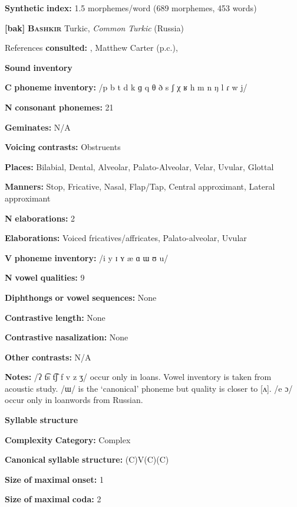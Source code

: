 \begin{styleBody}
\textbf{Synthetic} \textbf{index:} 1.5 morphemes/word (689 morphemes, 453 words)

\textbf{[bak]}   \textbf{\textsc{Bashkir}}  Turkic, \textit{Common} \textit{Turkic} (Russia)

References \textbf{consulted:} \citet{BerksonEtAl2016}, Matthew Carter (p.c.), \citet{Poppe1964}

\textbf{Sound} \textbf{inventory}

\textbf{C} \textbf{phoneme} \textbf{inventory:} /p b t d k ɡ q θ ð s ʃ χ ʁ h m n ŋ l ɾ w j/

\textbf{N} \textbf{consonant} \textbf{phonemes:} 21

\textbf{Geminates:} N/A

\textbf{Voicing} \textbf{contrasts:} Obstruents

\textbf{Places:} Bilabial, Dental, Alveolar, Palato-Alveolar, Velar, Uvular, Glottal

\textbf{Manners:} Stop, Fricative, Nasal, Flap/Tap, Central approximant, Lateral approximant

\textbf{N} \textbf{elaborations:} 2

\textbf{Elaborations:} Voiced fricatives/affricates, Palato-alveolar, Uvular

\textbf{V} \textbf{phoneme} \textbf{inventory:} /i y ɪ ʏ æ ɑ ɯ ʊ u/

\textbf{N} \textbf{vowel} \textbf{qualities:} 9

\textbf{Diphthongs} \textbf{or} \textbf{vowel} \textbf{sequences:} None

\textbf{Contrastive} \textbf{length:} None

\textbf{Contrastive} \textbf{nasalization:} None

\textbf{Other} \textbf{contrasts:} N/A

\textbf{Notes:} /ʔ t͡s t͡ʃ f v z ʒ/ occur only in loans. Vowel inventory is taken from \citet{BerksonEtAl2016} acoustic study. /ɯ/ is the ‘canonical’ phoneme but quality is closer to [ʌ]. /e ɔ/ occur only in loanwords from Russian.

\textbf{Syllable} \textbf{structure}

\textbf{Complexity} \textbf{Category:} Complex

\textbf{Canonical} \textbf{syllable} \textbf{structure:} (C)V(C)(C) \citep[12-18]{Poppe1964}

\textbf{Size} \textbf{of} \textbf{maximal} \textbf{onset:} 1

\textbf{Size} \textbf{of} \textbf{maximal} \textbf{coda:} 2


\end{styleBody}
